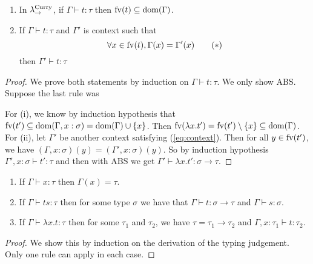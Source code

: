 \begin{boxlem}
    \hfill
    \begin{enumerate}
        \item In $\lamcur$, if $\Gamma \vdash t : \tau$ then $\fv{t} \subseteq \domain{\Gamma}$.
        \item {If $\Gamma \vdash t : \tau$ and $\Gamma'$ is context such that
            \begin{equation} \label{eq:context}
                \forall x \in \fv{t}, \Gamma(x) = \Gamma'(x) \tag{$*$}
            \end{equation}
            then $\Gamma' \vdash t : \tau$}
    \end{enumerate}
\end{boxlem}
\begin{proof}
    We prove both statements by induction on $\Gamma \vdash t : \tau$.
    We only show ABS.
    Suppose the last rule was
    \begin{prooftree}
    \end{prooftree}
    For (i), we know by induction hypothesis that $\fv{t'} \subseteq \domain{\Gamma, x : \sigma} = \domain{\Gamma} \cup \{x\}$.
    Then $\fv{\lambda x. t'} = \fv{t'} \setminus \{x\} \subseteq \domain{\Gamma}$.
    For (ii), let $\Gamma'$ be another context satisfying (\ref{eq:context}).
    Then for all $y \in \fv{t'}$, we have $(\Gamma, x : \sigma)(y) = (\Gamma', x : \sigma) (y)$.
    So by induction hypothesis $\Gamma', x : \sigma \vdash t' : \tau$ and then with ABS we get $\Gamma' \vdash \lambda x. t' : \sigma \to \tau$.
\end{proof}

\begin{boxlem}[Generation]\label{lem:generation}
    \hfill
    \begin{enumerate}
        \item If $\Gamma \vdash x : \tau$ then $\Gamma(x) = \tau$.
        \item If $\Gamma \vdash ts : \tau$ then for some type $\sigma$ we have that $\Gamma \vdash t : \sigma \to \tau$ and $\Gamma \vdash s : \sigma$.
        \item If $\Gamma \vdash \lambda x.t : \tau$ then for some $\tau_1$ and $\tau_2$, we have $\tau = \tau_1 \to \tau_2$ and $\Gamma, x : \tau_1 \vdash t : \tau_2$.
    \end{enumerate}
\end{boxlem}
\begin{proof}
    We show this by induction on the derivation of the typing judgement. Only one rule can apply in each case.
\end{proof}

